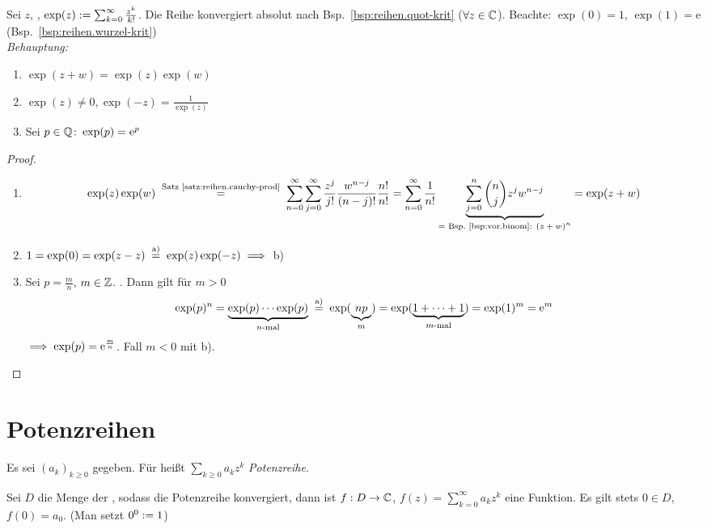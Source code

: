 \documentclass[12pt]{scrreprt}
\begin{document}
\begin{bsp}[Exponentialreihe]\label{bsp:reihen.expon-reihe}
Sei $z$, , $\exp(z) := \sum_{k=0}^\infty \frac{z^k}{k!}$.
Die Reihe konvergiert absolut nach Bsp.~\ref{bsp:reihen.quot-krit} ($\forall z\in\mathbb{C}$).
Beachte: $\exp(0) = 1$, $\exp(1) = \mathrm{e}$ (Bsp.~\ref{bsp:reihen.wurzel-krit})\\

\noindent\emph{Behauptung:}
\begin{enumerate}
\item $\exp(z+w) = \exp(z)\exp(w)$\label{bsp:reihen.expon-reihe.a}
\item $\exp(z) \neq 0, \exp(-z) = \frac{1}{\exp(z)}$\label{bsp:reihen.expon-reihe.b}
\item Sei $p\in\mathbb{Q}\colon\exp(p) = \mathrm{e}^p$\label{bsp:reihen.expon-reihe.c}
\end{enumerate}
\end{bsp}
\begin{proof}
\begin{enumerate}
\item \[\exp(z)\exp(w) \nach{=}{Satz~\ref{satz:reihen.cauchy-prod}} \sum_{n=0}^\infty\sum_{j=0}^\infty \frac{z^j}{j!} \frac{w^{n-j}}{(n-j)!} \frac{n!}{n!}
= \sum_{n=0}^\infty \frac{1}{n!} \underbrace{\sum_{j=0}^n \binom{n}{j}z^j w^{n-j}}_{\text{= Bsp.~\ref{bsp:vor.binom}: $(z+w)^n$}} 
= \exp(z+w)\]
\item $1 = \exp(0) = \exp(z-z) \nach{=}{a)} \exp(z)\exp(-z) \folgt$ b)
\item Sei $p = \frac{m}{n}$, $m\in\mathbb{Z}$. . Dann gilt für $m > 0$ 
\[\exp(p)^n = \underbrace{\exp(p)\dotsm\exp(p)}_{\text{$n$-mal}} \nach{=}{a)} \exp(\underbrace{np}_m)
= \exp(\underbrace{1+\dotsb+1}_{\text{$m$-mal}}) = \exp(1)^m =\mathrm{e}^m\]
$\implies \exp(p) = \mathrm{e}^{\frac{m}{n}}$. Fall $m < 0$ mit b).
\end{enumerate}
\end{proof}

\section{Potenzreihen}
\label{sec:reihen.potenzreihe}
\begin{dfn}\label{dfn:reihen.potenzreihe}
Es sei $(a_k)_{k\ge 0}$ gegeben. Für  heißt $\sum_{k\ge 0} a_kz^k$ \emph{Potenzreihe}.
\end{dfn}

\begin{bem*}
Sei $D$ die Menge der , sodass die Potenzreihe konvergiert, dann ist 
$f: D \rightarrow \mathbb{C}$, $f(z) = \sum_{k=0}^\infty a_kz^k$ eine Funktion. Es gilt stets
$0\in D$, $f(0)=a_0$. (Man setzt $0^0 := 1$)
\end{bem*}
\end{document}
